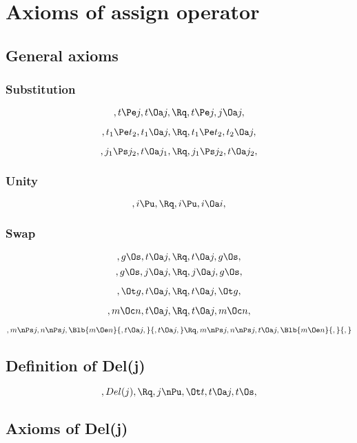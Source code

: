 \chapter{Axioms of assign operator}

\section{General axioms}
\subsection{Substitution}
\[,t \Pe j, t \Oa j, \Rq , t \Pe j, j \Oa j,\]

\[, t_1 \Pe t_2, t_1 \Oa j, \Rq , t_1 \Pe t_2, t_2 \Oa j, \]

\[, j_1 \Ps j_2, t \Oa j_1, \Rq , j_1 \Ps j_2, t \Oa j_2, \]


\bigskip
\bigskip
\subsection{Unity}
\[, i \Pu, \Rq , i \Pu, i \Oa i, \]



\bigskip
\bigskip
\subsection{Swap}
\[, g \Os, t \Oa j, \Rq , t \Oa j, g \Os, \]
\[, g \Os, j \Oa j, \Rq , j \Oa j, g \Os, \]

\[, \Ot g, t \Oa j, \Rq , t \Oa j, \Ot g, \]

\[, m \Oc n, t \Oa j, \Rq , t \Oa j, m \Oc n, \]

\[, m \nPs j, n \nPs j, \Blb{m \Oe n}{, t \Oa j, }{, t \Oa j,} \Rq , m \nPs j, n \nPs j, t \Oa j, \Blb{m \Oe n}{,}{,} \]









\bigskip
\bigskip
\bigskip
\bigskip
\section{Definition of Del(j)}
\[,Del(j), \Rq , j \nPu, \Ot t, t \Oa j, t \Os, \]







\bigskip
\bigskip
\section{Axioms of Del(j)}
